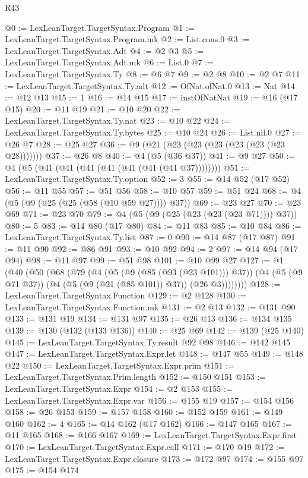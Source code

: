 \begin{lexlean}{R43}
\begin{coremodule}
@0 := LexLeanTarget.TargetSyntax.Program
@1 := LexLeanTarget.TargetSyntax.Program.mk
@2 := List.cons.{0}
@3 := LexLeanTarget.TargetSyntax.Adt
@4 := @2 @3
@5 := LexLeanTarget.TargetSyntax.Adt.mk
@6 := List.{0}
@7 := LexLeanTarget.TargetSyntax.Ty
@8 := @6 @7
@9 := @2 @8
@10 := @2 @7
@11 := LexLeanTarget.TargetSyntax.Ty.adt
@12 := OfNat.ofNat.{0}
@13 := Nat
@14 := @12 @13
@15 := 1
@16 := @14 @15
@17 := instOfNatNat
@19 := @16 (@17 @15)
@20 := @11 @19
@21 := @10 @20
@22 := LexLeanTarget.TargetSyntax.Ty.nat
@23 := @10 @22
@24 := LexLeanTarget.TargetSyntax.Ty.bytes
@25 := @10 @24
@26 := List.nil.{0}
@27 := @26 @7
@28 := @25 @27
@36 := @9 (@21 (@23 (@23 (@23 (@23 (@23 (@23 @28)))))))
@37 := @26 @8
@40 := @4 (@5 (@36 @37))
@41 := @9 @27
@50 := @4 (@5 (@41 (@41 (@41 (@41 (@41 (@41 (@41 @37))))))))
@51 := LexLeanTarget.TargetSyntax.Ty.option
@52 := 3
@55 := @14 @52 (@17 @52)
@56 := @11 @55
@57 := @51 @56
@58 := @10 @57
@59 := @51 @24
@68 := @4 (@5 (@9 (@25 (@25 (@58 (@10 @59 @27)))) @37))
@69 := @23 @27
@70 := @23 @69
@71 := @23 @70
@79 := @4 (@5 (@9 (@25 (@23 (@23 (@23 @71)))) @37))
@80 := 5
@83 := @14 @80 (@17 @80)
@84 := @11 @83
@85 := @10 @84
@86 := LexLeanTarget.TargetSyntax.Ty.list
@87 := 0
@90 := @14 @87 (@17 @87)
@91 := @11 @90
@92 := @86 @91
@93 := @10 @92
@94 := 2
@97 := @14 @94 (@17 @94)
@98 := @11 @97
@99 := @51 @98
@101 := @10 @99 @27
@127 := @1
    (@40
      (@50
        (@68
          (@79
            (@4
              (@5 (@9 (@85 (@93 (@23 @101))) @37))
              (@4 (@5 (@9 @71 @37)) (@4 (@5 (@9 (@21 (@85 @101)) @37)) (@26 @3))))))))
@128 := LexLeanTarget.TargetSyntax.Function
@129 := @2 @128
@130 := LexLeanTarget.TargetSyntax.Function.mk
@131 := @2 @13
@132 := @131 @90
@133 := @131 @19
@134 := @131 @97
@135 := @26 @13
@136 := @134 @135
@139 := @130 (@132 (@133 @136))
@140 := @25 @69
@142 := @139 (@25 @140)
@145 := LexLeanTarget.TargetSyntax.Ty.result @92 @98
@146 := @142 @145
@147 := LexLeanTarget.TargetSyntax.Expr.let
@148 := @147 @55
@149 := @148 @22
@150 := LexLeanTarget.TargetSyntax.Expr.prim
@151 := LexLeanTarget.TargetSyntax.Prim.length
@152 := @150 @151
@153 := LexLeanTarget.TargetSyntax.Expr
@154 := @2 @153
@155 := LexLeanTarget.TargetSyntax.Expr.var
@156 := @155 @19
@157 := @154 @156
@158 := @26 @153
@159 := @157 @158
@160 := @152 @159
@161 := @149 @160
@162 := 4
@165 := @14 @162 (@17 @162)
@166 := @147 @165
@167 := @11 @165
@168 := @166 @167
@169 := LexLeanTarget.TargetSyntax.Expr.first
@170 := LexLeanTarget.TargetSyntax.Expr.call
@171 := @170 @19
@172 := LexLeanTarget.TargetSyntax.Expr.closure
@173 := @172 @97
@174 := @155 @97
@175 := @154 @174

\end{coremodule}
\end{lexlean}
